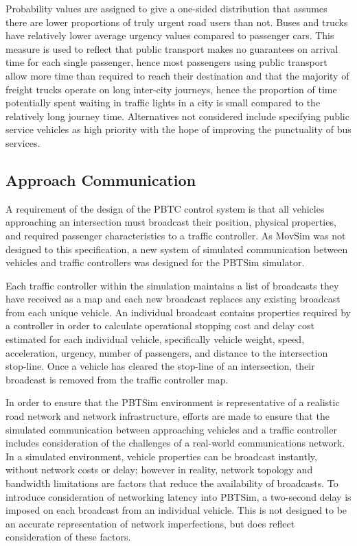 Probability values are assigned to give a one-sided distribution that assumes there are lower proportions of truly urgent road users than not. Buses and trucks have relatively lower average urgency values compared to passenger cars. This measure is used to reflect that public transport makes no guarantees on arrival time for each single passenger, hence most passengers using public transport allow more time than required to reach their destination and that the majority of freight trucks operate on long inter-city journeys, hence the proportion of time potentially spent waiting in traffic lights in a city is small compared to the relatively long journey time. Alternatives not considered include specifying public service vehicles as high priority with the hope of improving the punctuality of bus services. %

\subsection{Approach Communication}

A requirement of the design of the PBTC control system is that all vehicles approaching an intersection must broadcast their position, physical properties, and required passenger characteristics to a traffic controller. As MovSim was not designed to this specification, a new system of simulated communication between vehicles and traffic controllers was designed for the PBTSim simulator.

Each traffic controller within the simulation maintains a list of broadcasts they have received as a map and each new broadcast replaces any existing broadcast from each unique vehicle. An individual broadcast contains properties required by a controller in order to calculate operational stopping cost and delay cost estimated for each individual vehicle, specifically vehicle weight, speed, acceleration, urgency, number of passengers, and distance to the intersection stop-line. Once a vehicle has cleared the stop-line of an intersection, their broadcast is removed from the traffic controller map. 

In order to ensure that the PBTSim environment is representative of a realistic road network and network infrastructure, efforts are made to ensure that the simulated communication between approaching vehicles and a traffic controller includes consideration of the challenges of a real-world communications network. In a simulated environment, vehicle properties can be broadcast instantly, without network costs or delay; however in reality, network topology and bandwidth limitations are factors that reduce the availability of broadcasts. To introduce consideration of networking latency into PBTSim, a two-second delay is imposed on each broadcast from an individual vehicle. This is not designed to be an accurate representation of network imperfections, but does reflect consideration of these factors.

